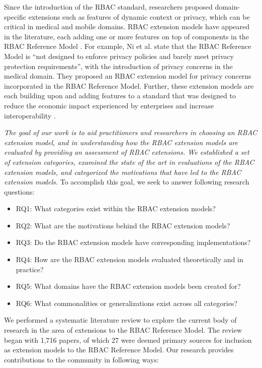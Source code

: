 Since the introduction of the RBAC standard, researchers proposed domain-specific extensions such as features of dynamic context or privacy, which
can be critical in medical and mobile domains. RBAC extension models have appeared in the literature, each adding one or more features on top of components in the RBAC Reference Model \cite{kuhn2010adding}.
For example, Ni et al. \cite{ni2010privacy} state that the RBAC Reference Model is ``not designed to enforce privacy policies and barely 
meet privacy protection requirements'', with the introduction of privacy concerns in the medical domain.
They proposed an RBAC extension model for privacy concerns incorporated in the RBAC Reference Model.
Further, these extension models are each building upon and adding features to a standard that was designed to reduce the economic impact experienced by enterprises and increase interoperability \cite{o20102010}.

\textit{The goal of our work is to aid practitioners and researchers in choosing an RBAC extension model, and in understanding
how the RBAC extension models are evaluated by providing an assessment of RBAC extensions. We established a set of extension categories, examined the state of the art in evaluations of the RBAC extension models, and categorized the motivations that have led to the RBAC extension models.
} To accomplish this goal, we seek to answer following research questions:

\begin{itemize}
\setlength{\itemsep}{0.25pt}
\item RQ1: What categories exist within the RBAC extension models?
\item RQ2: What are the motivations behind the RBAC extension models?
\item RQ3: Do the RBAC extension models have corresponding implementations?
\item RQ4: How are the RBAC extension models evaluated theoretically and in practice?
\item RQ5: What domains have the RBAC extension models been created for?
\item RQ6: What commonalities or generalizations exist across all categories?
\end{itemize}

We performed a systematic literature review to explore the current body of research in the area of extensions to the RBAC Reference Model. 
The review began with 1,716 papers, of which 27 were deemed primary sources for inclusion as extension models to the RBAC Reference Model.
Our research provides contributions to the community in following ways:

